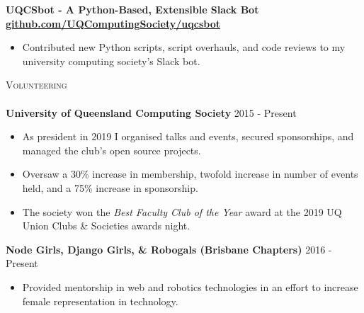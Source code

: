 \documentclass[a4paper]{article}
\newcommand{\lineunder} {
    \vspace*{-8pt} \\
    \hspace*{-10pt} \hrulefill \\
}
\newcommand{\header} [1] {
    {\hspace*{-10pt}\vspace*{6pt} \textsc{#1}}
    \vspace*{-6pt} \lineunder
}
\newenvironment{singleitem}
{   \small
    \vspace{0pt}
    \begin{itemize}
    \setlength{\itemsep}{0pt}
    \setlength{\parskip}{0pt}
    \setlength{\parsep}{0pt}   }
{\end{itemize} \vspace{1pt}	}
\begin{document}
\textbf{UQCSbot - A Python-Based, Extensible Slack Bot} \hfill \textbf{\href{https://github.com/UQComputingSociety/uqcsbot}{github.com/UQComputingSociety/uqcsbot}}
\begin{singleitem}
	\item Contributed new Python scripts, script overhauls, and code reviews to my university computing society's Slack bot.
\end{singleitem}




\vspace{1mm}

\header{Volunteering}
\textbf{University of Queensland Computing Society} \hfill 2015 - Present\\
\begin{singleitem}
	\item As president in 2019 I organised talks and events, secured sponsorships, and managed the club's open source projects.
	\item Oversaw a 30\% increase in membership, twofold increase in number of events held, and a 75\% increase in sponsorship.
	\item The society won the \textit{Best Faculty Club of the Year} award at the 2019 UQ Union Clubs \& Societies awards night.
\end{singleitem}
\textbf{Node Girls, Django Girls, \& Robogals (Brisbane Chapters)} \hfill 2016 - Present\\
\begin{singleitem}
	\item Provided mentorship in web and robotics technologies in an effort to increase female representation in technology.
\end{singleitem}
\end{document}
